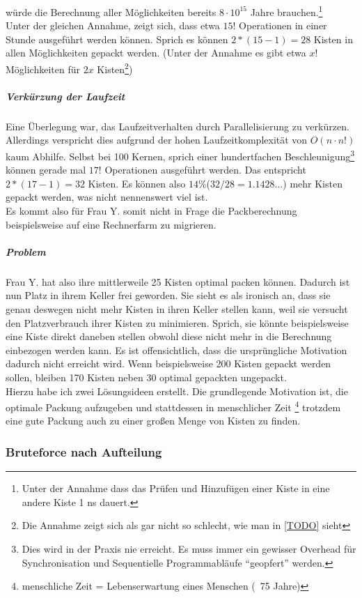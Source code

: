 würde die Berechnung aller Möglichkeiten bereits $8 \cdot 10^{15}$ Jahre brauchen.\footnote{Unter der Annahme dass das Prüfen und Hinzufügen einer Kiste in eine andere Kiste 1 ns dauert.} \\
Unter der gleichen Annahme, zeigt sich, dass etwa $15!$ Operationen in einer Stunde ausgeführt werden können.
Sprich es können $2*(15-1)=28$ Kisten in allen Möglichkeiten gepackt werden.
(Unter der Annahme es gibt etwa $x!$ Möglichkeiten für $2x$ Kisten\footnote{Die Annahme zeigt sich als gar nicht so schlecht, wie man in \ref{TODO} sieht})
\subparagraph{Verkürzung der Laufzeit} Eine Überlegung war, das Laufzeitverhalten durch Parallelisierung zu verkürzen.
Allerdings verspricht dies aufgrund der hohen Laufzeitkomplexität von $O(n \cdot n!)$ kaum Abhilfe.
Selbst bei 100 Kernen, sprich einer hundertfachen Beschleunigung\footnote{Dies wird in der Praxis nie erreicht.
Es muss immer ein gewisser Overhead für Synchronisation und Sequentielle Programmabläufe ``geopfert'' werden.}
können gerade mal $17!$ Operationen ausgeführt werden. Das entspricht $2*(17-1)=32$ Kisten.
Es können also $14\%$($32/28=1.1428\dots$) mehr Kisten gepackt werden, was nicht nennenswert viel ist. \\
Es kommt also für Frau Y. somit nicht in Frage die Packberechnung beispielsweise auf eine Rechnerfarm zu migrieren. \\
\subparagraph{Problem}
Frau Y. hat also ihre mittlerweile 25 Kisten optimal packen können. Dadurch ist nun Platz in ihrem Keller frei geworden.
Sie sieht es als ironisch an, dass sie genau deswegen nicht mehr Kisten in ihren Keller stellen kann, weil sie versucht den Platzverbrauch ihrer Kisten zu minimieren.
Sprich, sie könnte beispielsweise eine Kiste direkt daneben stellen obwohl diese nicht mehr in die Berechnung einbezogen werden kann.
Es ist offensichtlich, dass die ursprüngliche Motivation dadurch nicht erreicht wird.
Wenn beispielsweise 200 Kisten gepackt werden sollen, bleiben 170 Kisten neben 30 optimal gepackten ungepackt. \\
Hierzu habe ich zwei Lösungsideen erstellt. Die grundlegende Motivation ist,
die optimale Packung aufzugeben und stattdessen in menschlicher Zeit
\footnote{menschliche Zeit = Lebenserwartung eines Menschen (~75 Jahre)} trotzdem eine gute Packung auch zu einer großen Menge von Kisten zu finden.
\subsubsection{Bruteforce nach Aufteilung}
